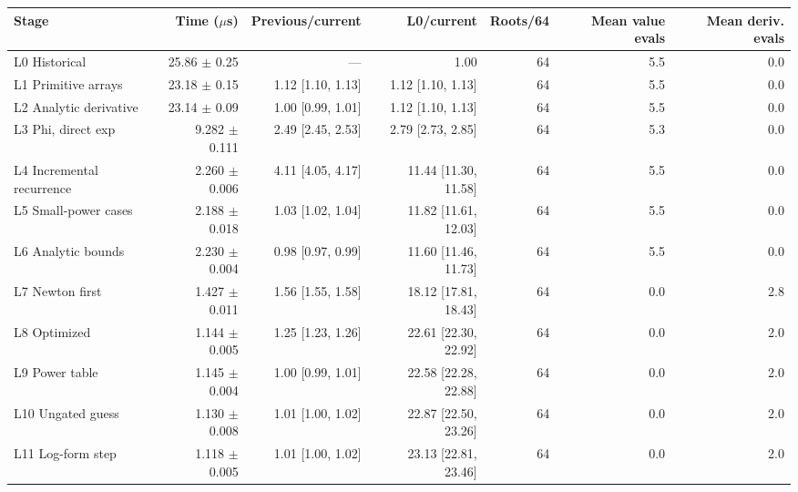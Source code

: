 \begin{tabular}{lrrrrrr}
\toprule
Stage & Time ($\mu$s) & Previous/current & L0/current & Roots/64 & Mean value evals & Mean deriv. evals \\
\midrule
L0 Historical & 25.86 $\pm$ 0.25 & --- & 1.00 & 64 & 5.5 & 0.0 \\
L1 Primitive arrays & 23.18 $\pm$ 0.15 & 1.12 [1.10, 1.13] & 1.12 [1.10, 1.13] & 64 & 5.5 & 0.0 \\
L2 Analytic derivative & 23.14 $\pm$ 0.09 & 1.00 [0.99, 1.01] & 1.12 [1.10, 1.13] & 64 & 5.5 & 0.0 \\
L3 Phi, direct exp & 9.282 $\pm$ 0.111 & 2.49 [2.45, 2.53] & 2.79 [2.73, 2.85] & 64 & 5.3 & 0.0 \\
L4 Incremental recurrence & 2.260 $\pm$ 0.006 & 4.11 [4.05, 4.17] & 11.44 [11.30, 11.58] & 64 & 5.5 & 0.0 \\
L5 Small-power cases & 2.188 $\pm$ 0.018 & 1.03 [1.02, 1.04] & 11.82 [11.61, 12.03] & 64 & 5.5 & 0.0 \\
L6 Analytic bounds & 2.230 $\pm$ 0.004 & 0.98 [0.97, 0.99] & 11.60 [11.46, 11.73] & 64 & 5.5 & 0.0 \\
L7 Newton first & 1.427 $\pm$ 0.011 & 1.56 [1.55, 1.58] & 18.12 [17.81, 18.43] & 64 & 0.0 & 2.8 \\
L8 Optimized & 1.144 $\pm$ 0.005 & 1.25 [1.23, 1.26] & 22.61 [22.30, 22.92] & 64 & 0.0 & 2.0 \\
L9 Power table & 1.145 $\pm$ 0.004 & 1.00 [0.99, 1.01] & 22.58 [22.28, 22.88] & 64 & 0.0 & 2.0 \\
L10 Ungated guess & 1.130 $\pm$ 0.008 & 1.01 [1.00, 1.02] & 22.87 [22.50, 23.26] & 64 & 0.0 & 2.0 \\
L11 Log-form step & 1.118 $\pm$ 0.005 & 1.01 [1.00, 1.02] & 23.13 [22.81, 23.46] & 64 & 0.0 & 2.0 \\
\bottomrule
\end{tabular}

